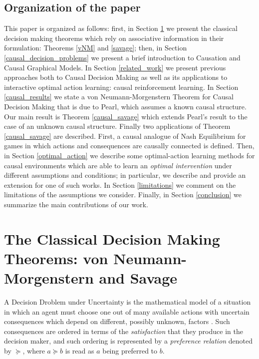 \documentclass[review]{elsarticle}
\begin{document}
\subsection{Organization of the paper}
\label{organization}
This paper is organized as follows: first, in Section \ref{classical_theorems} we present the classical decision making theorems which rely on associative information in their formulation: Theorems \ref{vNM} and \ref{savage}; then, in Section \ref{causal_decision_problems} we present a brief introduction to Causation and Causal Graphical Models. In Section \ref{related_work} we present previous approaches both to Causal Decision Making as well as its applications to interactive optimal action learning: causal reinforcement learning. In Section \ref{causal_results} we state a von Neumann-Morgenstern Theorem for Causal Decision Making that is due to Pearl, which assumes a known causal structure. Our main result is Theorem \ref{causal_savage} which extends Pearl's result to the case of an unknown causal structure. Finally two applications of Theorem \ref{causal_savage} are described. First, a causal analogue of Nash Equilibrium for games in which actions and consequences are causally connected is defined. Then, in Section \ref{optimal_action} we describe some optimal-action learning methods for causal environments which are able to learn an \textit{optimal intervention} under different assumptions and conditions; in particular, we describe and provide an extension for one of such works. In Section \ref{limitations} we comment on the limitations of the assumptions we consider. Finally, in Section \ref{conclusion} we summarize the main contributions of our work.

\section{The Classical Decision Making Theorems: von Neumann-Morgenstern and Savage}
\label{classical_theorems}
A Decision Droblem under Uncertainty is the mathematical model of a situation in which an agent must choose one out of many available actions with uncertain consequences which depend on different, possibly unknown, factors \citep{bernardo2000bayesian,gilboa2009decision}. Such consequences are ordered in terms of the \textit{satisfaction} that they produce in the decision maker, and such ordering is represented by a \textit{preference relation} denoted by $\succeq$, where $a \succeq b$ is read as $a$ being preferred to $b$.
\end{document}
